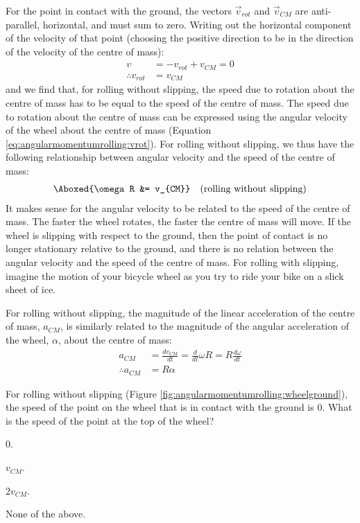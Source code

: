 For the point in contact with the ground, the vectors $\vec v_{rot}$ and $\vec v_{CM}$ are anti-parallel, horizontal, and must sum to zero. Writing out the horizontal component of the velocity of that point (choosing the positive direction to be in the direction of the velocity of the centre of mass):
\begin{align*}
v &= -v_{rot} + v_{CM} = 0\\
\therefore v_{rot} &= v_{CM}
\end{align*}
and we find that, for rolling without slipping, the speed due to rotation about the centre of mass has to be equal to the speed of the centre of mass. The speed due to rotation about the centre of mass can be expressed using the angular velocity of the wheel about the centre of mass (Equation \ref{eq:angularmomentumrolling:vrot}). For rolling without slipping, we thus have the following relationship between angular velocity and the speed of the centre of mass:
\begin{align}
\Aboxed{\omega R &= v_{CM}}\quad \text{(rolling without slipping)}
\end{align}
It makes sense for the angular velocity to be related to the speed of the centre of mass. The faster the wheel rotates, the faster the centre of mass will move. If the wheel is slipping with respect to the ground, then the point of contact is no longer stationary relative to the ground, and there is no relation between the angular velocity and the speed of the centre of mass. For rolling with slipping, imagine the motion of your bicycle wheel as you try to ride your bike on a slick sheet of ice.

For rolling without slipping, the magnitude of the linear acceleration of the centre of mass, $a_{CM}$, is similarly related to the magnitude of the angular acceleration of the wheel, $\alpha$, about the centre of mass:
\begin{align*}
a_{CM} &= \frac{dv_{CM}}{dt} = \frac{d}{dt}\omega R = R \frac{d\omega}{dt}\\
\therefore a_{CM} &= R\alpha
\end{align*}

\begin{checkpoint}
\begin{MCquestion}{For rolling without slipping (Figure \ref{fig:angularmomentumrolling:wheelground}), the speed of the point on the wheel that is in contact with the ground is 0. What is the speed of the point at the top of the wheel?}
\item 0.
\item $v_{CM}$.
\item $2v_{CM}$.\correct
\item None of the above.
\end{MCquestion}
\end{checkpoint}


